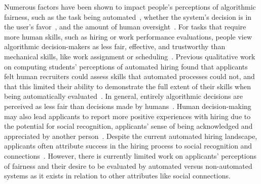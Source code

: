 Numerous factors have been shown to impact people's perceptions of algorithmic fairness, such as the task being automated~\cite{lee2018understanding, zhang2022examining}, whether the system's decision is in the user's favor~\cite{wang2020factors}, and the amount of human oversight~\cite{lee2017algorithmic, gonzalez2022allying}. For tasks that require more human skills, such as hiring or work performance evaluations, people view algorithmic decision-makers as less fair, effective, and trustworthy than mechanical skills, like work assignment or scheduling~\cite{lee2018understanding}. Previous qualitative work on computing students' perceptions of automated hiring found that applicants felt human recruiters could assess skills that automated processes could not, and that this limited their ability to demonstrate the full extent of their skills when being automatically evaluated~\cite{armstrong2023navigating}. In general, entirely algorithmic decisions are perceived as less fair than decisions made by humans~\cite{lee2017algorithmic, gonzalez2022allying}. Human decision-making may also lead applicants to report more positive experiences with hiring due to the potential for social recognition, applicants' sense of being acknowledged and appreciated by another person~\cite{lee2018understanding, armstrong2023navigating}. Despite the current automated hiring landscape, applicants often attribute success in the hiring process to social recognition and connections~\cite{armstrong2023navigating, chua2021playing}. However, there is currently limited work on applicants' perceptions of fairness and their desire to be evaluated by automated versus non-automated systems as it exists in relation to other attributes like social connections.


